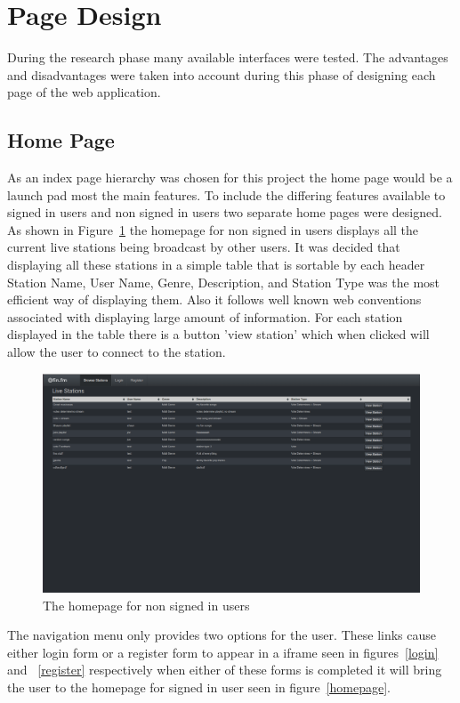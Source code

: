 \documentclass[a4paper, 12pt]{report}
\begin{document}
\section{Page Design}
During the research phase many available interfaces were tested. The advantages and disadvantages were taken into account during this phase of designing each page of the web application.

\subsection{Home Page}
As an index page hierarchy was chosen for this project the home page would be a launch pad most the main features. To include the differing features available to signed in users and non signed in users two separate home pages were designed. As shown in Figure~\ref{homepage-anon} the homepage for non signed in users displays all the current live stations being broadcast by other users. It was decided that displaying all these stations in a simple table that is sortable by each header Station Name, User Name, Genre, Description, and Station Type was the most efficient way of displaying them. Also it follows well known web conventions associated with displaying large amount of information. For each station displayed in the table there is a button 'view station' which when clicked will allow the user to connect to the station. \\
\begin{figure}[H]
  \centering
    \includegraphics[width=1.0\textwidth]{screenshots/homepage-anon.png}
    \caption{The homepage for non signed in users}
    \label{homepage-anon}
\end{figure}
The navigation menu only provides two options for the user. These links cause either login form or a register form to appear in a iframe seen in figures~\ref{login} and ~\ref{register} respectively when either of these forms is completed it will bring the user to the homepage for signed in user seen in figure~\ref{homepage}.\\
\end{document}
